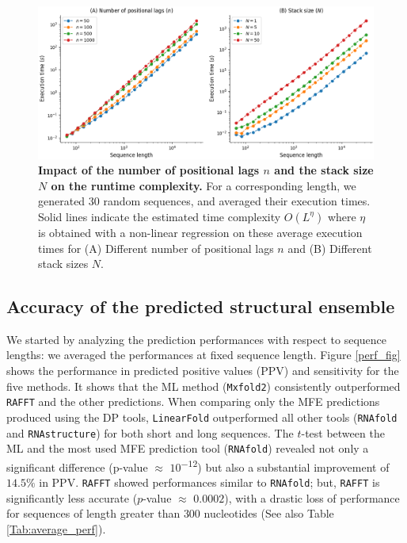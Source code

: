 \begin{figure}[t!]
	\centering
	\includegraphics[width=1.0\linewidth]{../res/images/rafft/CPU_time.png}
	\caption{\label{Fig:scalability}\textbf{Impact of the number of positional lags $n$ and the stack size $N$
			on the runtime complexity.} For a corresponding length, we generated $30$
		random sequences, and averaged their execution times. Solid lines indicate
		the estimated time complexity $O(L^\eta)$ where $\eta$ is obtained with a
		non-linear regression on these average execution times for (A) Different number
		of positional lags $n$ and (B) Different stack sizes $N$.}
\end{figure} 

\subsection{Accuracy of the predicted structural ensemble}
We started by analyzing the prediction performances with respect to sequence lengths: we averaged the performances at fixed sequence length. Figure \ref{perf_fig} shows the performance in predicted positive values (PPV) and sensitivity for the five methods. It shows that the ML method (\texttt{Mxfold2}) consistently outperformed \texttt{RAFFT} and the other predictions. When comparing only the MFE predictions produced using the DP tools, \texttt{LinearFold} outperformed all other tools (\texttt{RNAfold} and \texttt{RNAstructure}) for both short and long sequences. The $t$-test between the ML and the most used MFE prediction tool (\texttt{RNAfold}) revealed not only a significant difference (p-value \(\approx\) $10$\textsuperscript{$-12$}) but also a substantial improvement of $14.5\%$ in PPV. \texttt{RAFFT} showed performances similar to \texttt{RNAfold}; but, \texttt{RAFFT} is significantly less accurate ($p$-value \(\approx\) $0.0002$), with a drastic loss of performance for sequences of length greater than $300$ nucleotides (See also Table \ref{Tab:average_perf}).

